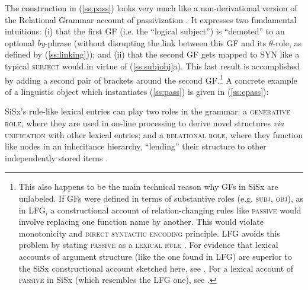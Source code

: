 \documentclass[output=paper,hidelinks]{langscibook}
\begin{document}
The construction in (\ref{ss:pass}) looks very much like a non-derivational version of the Relational Grammar account of passivization \citep{perlmutter1977toward}. It expresses two fundamental intuitions: (i) that the first GF (i.e. the ``logical subject'') is ``demoted'' to an optional \textit{by}-phrase (without disrupting the link between this GF and its $\theta$-role, as defined by (\ref{ss:linking})); and (ii) that the second GF gets mapped to SYN like a typical \textsc{subject} would in virtue of (\ref{ss:subjobj}a). This last result is accomplished by adding a second pair of brackets around the second GF.\footnote{This also happens to be the main technical reason why GFs in SiSx are unlabeled. If GFs were defined in terms of substantive roles (e.g. \textsc{subj}, \textsc{obj}), as in LFG, a constructional account of relation-changing rules like \textsc{passive} would involve replacing one function name by another. This would violate monotonicity and   \textsc{direct syntactic encoding} principle. LFG avoids this problem by stating \textsc{passive} as a \textsc{lexical rule} \citep{bresnan1982the-passive}. For evidence that lexical accounts of argument structure (like the one found in LFG) are superior to the SiSx constructional account sketched here, see \citet{muller2013unifying, muller2018grammatical}. For a lexical account of \textsc{passive} in SiSx (which resembles the LFG one), see \citet{culicover2019origin}.} A concrete example of a linguistic object which instantiates (\ref{ss:pass}) is given in (\ref{ss:epass}):





SiSx's rule-like lexical entries can play two roles in the grammar: a \textsc{generative role}, where they are used in on-line processing to derive novel structures \textit{via} \textsc{unification} with other lexical entries; and a \textsc{relational role}, where they function like nodes in an inheritance hierarchy, ``lending'' their structure to other independently stored items \citep{jackendoff2020texture}. 
\end{document}
